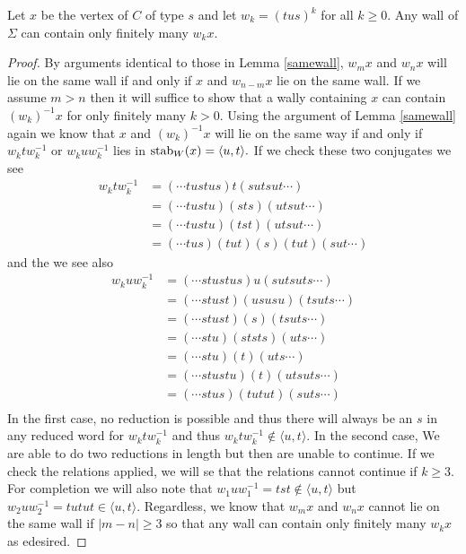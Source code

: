 \documentclass[class=book, crop=false]{standalone}
\begin{document}
\begin{lemma}
	\label{336f2finitewalls}
	Let $x$ be the vertex of $C$ of type $s$ and let $w_k=(tus)^k$ for all $k\ge 0.$ Any wall of $\Sigma$ can contain only finitely many $w_kx.$
\end{lemma}
\begin{proof}
	By arguments identical to those in Lemma \ref{samewall}, $w_mx$ and $w_{n}x$ will lie on the same wall if and only if $x$ and $w_{n-m}x$ lie on the same wall. If we assume $m>n$ then it will suffice to show that a wally containing $x$ can contain $(w_k)^{-1}x$ for only finitely many $k>0.$ Using the argument of Lemma \ref{samewall} again we know that $x$ and $(w_k)^{-1}x$ will lie on the same way if and only if $w_ktw_k^{-1}$ or $w_kuw_k^{-1}$ lies in $\mathrm{stab}_{W}(x)=\langle u,t\rangle.$ If we check these two conjugates we see 
\begin{align*}
	w_ktw_k^{-1}&=(\cdots tustus)t(sutsut\cdots)\\
		    &=(\cdots tustu)(sts)(utsut\cdots)\\
		    &=(\cdots tustu)(tst)(utsut\cdots)\\
		    &=(\cdots tus)(tut)(s)(tut)(sut\cdots)
\end{align*}
and the we see also
\begin{align*}
	w_kuw_k^{-1}&=(\cdots stustus)u(sutsuts\cdots)\\
		    &=(\cdots stust)(ususu)(tsuts\cdots)\\
		    &=(\cdots stust)(s)(tsuts\cdots)\\
		    &=(\cdots stu)(ststs)(uts\cdots)\\
		    &=(\cdots stu)(t)(uts\cdots)\\
		    &=(\cdots stustu)(t)(utsuts\cdots)\\
		    &=(\cdots stus)(tutut)(suts\cdots)\\
\end{align*}
In the first case, no reduction is possible and thus there will always be an $s$ in any reduced word for $w_ktw_k^{-1}$ and thus $w_ktw_k^{-1}\not\in \langle u,t \rangle.$ In the second case, We are able to do two reductions in length but then are unable to continue. If we check the relations applied, we will se that the relations cannot continue if $k\ge 3.$ For completion we will also note that $w_1uw_1^{-1}=tst\not\in \langle u,t \rangle$ but $w_2uw_2^{-1}=tutut\in \langle u,t\rangle.$ Regardless, we know that $w_mx$ and $w_nx$ cannot lie on the same wall if $|m-n|\ge 3$ so that any wall can contain only finitely many $w_kx$ as edesired.

\end{proof}
\end{document}
